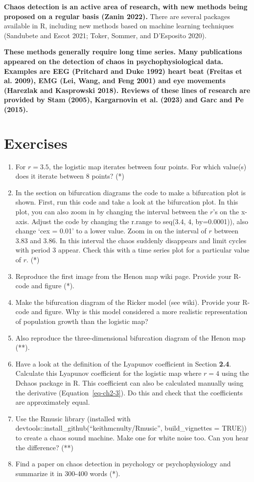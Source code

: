 \documentclass[
  letterpaper,
]{scrbook}
\begin{document}
\textbf{Chaos detection is an active area of research, with new methods
being proposed on a regular basis (Zanin 2022).} There are several
packages available in R, including new methods based on machine learning
techniques (Sandubete and Escot 2021; Toker, Sommer, and D'Esposito
2020).

\textbf{These methods generally require long time series. Many
publications appeared on the detection of chaos in psychophysiological
data. Examples are EEG (Pritchard and Duke 1992) heart beat (Freitas et
al. 2009), EMG (Lei, Wang, and Feng 2001) and eye movements (Harezlak
and Kasprowski 2018). Reviews of these lines of research are provided by
Stam (2005), Kargarnovin et al. (2023) and Garc and Pe (2015).}

\hypertarget{exercises-1}{%
\section{Exercises}\label{exercises-1}}

\begin{enumerate}
\def\labelenumi{\arabic{enumi})}
\item
  For \(r=3.5\), the logistic map iterates between four points. For
  which value(s) does it iterate between 8 points? (*)
\item
  In the section on bifurcation diagrams the code to make a bifurcation
  plot is shown. First, run this code and take a look at the bifurcation
  plot. In this plot, you can also zoom in by changing the interval
  between the \(r\)'s on the x-axis. Adjust the code by changing the
  r.range to seq(3.4, 4, by=0.0001)), also change `cex = 0.01' to a
  lower value. Zoom in on the interval of \(r\) between 3.83 and 3.86.
  In this interval the chaos suddenly disappears and limit cycles with
  period 3 appear. Check this with a time series plot for a particular
  value of \(r\). (*)
\item
  Reproduce the first image from the Henon map wiki page. Provide your
  R-code and figure (*).
\item
  Make the bifurcation diagram of the Ricker model (see wiki). Provide
  your R-code and figure. Why is this model considered a more realistic
  representation of population growth than the logistic map?
\item
  Also reproduce the three-dimensional bifurcation diagram of the Henon
  map (**).
\item
  Have a look at the definition of the Lyapunov coefficient in Section
  \textbf{2.4}. Calculate this Lyapunov coefficient for the logistic map
  where \(r = 4\) using the Dchaos package in R. This coefficient can
  also be calculated manually using the derivative
  (Equation~\ref{eq-ch2-3}). Do this and check that the coefficients are
  approximately equal.
\item
  Use the Rmusic library (installed with
  devtools::install\_github(``keithmcnulty/Rmusic'', build\_vignettes =
  TRUE)) to create a chaos sound machine. Make one for white noise too.
  Can you hear the difference? (**)
\item
  Find a paper on chaos detection in psychology or psychophysiology and
  summarize it in 300-400 words (*).
\end{enumerate}
\end{document}
